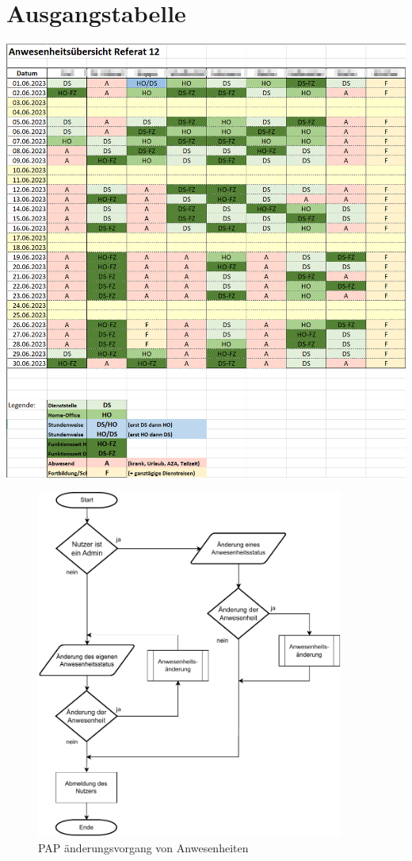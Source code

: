 \section{Ausgangstabelle}
\label{abb:Ausgangstabelle}
\includegraphics[page=1,height=1\textwidth]{anhang/abb/Tabelle.png}


\begin{figure}[htb]
    \centering
    \includegraphics[width=0.9\textwidth,angle=0]{anhang/abb/PAP_Kurz.pdf}
    \caption[Beschreibung]{PAP änderungsvorgang von Anwesenheiten}
    \label{abb:PAP}
\end{figure}

